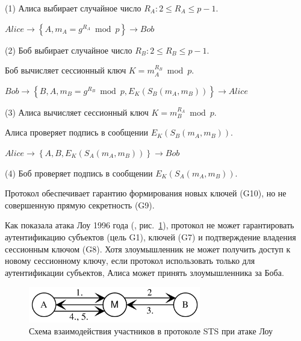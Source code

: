 \begin{protocol}
    \item[(1)] Алиса выбирает случайное число $R_A: 2 \leq R_A \leq p-1$.
    \item[{}] $Alice \to \left\{ A, m_A = g^{R_A} \bmod p \right\} \to Bob$

    \item[(2)] Боб выбирает случайное число $R_B: 2 \leq R_B \leq p-1$.
    \item[{}] Боб вычисляет сессионный ключ $K = m_A^{R_B} \bmod p$.
    \item[{}] $Bob \to \left\{ B, A, m_B = g^{R_B} \bmod p, E_K( S_B ( m_A, m_B )) \right\} \to Alice$

    \item[(3)] Алиса вычисляет сессионный ключ $K = m_B^{R_A} \bmod p$.
    \item[{}] Алиса проверяет подпись в сообщении $E_K( S_B ( m_A, m_B ))$.
    \item[{}] $Alice \to \left\{ A, B, E_K( S_A ( m_A, m_B ) ) \right\} \to Bob$

    \item[(4)] Боб проверяет подпись в сообщении $E_K( S_A ( m_A, m_B ))$.
\end{protocol}

Протокол обеспечивает гарантию формирования новых ключей (G10), но не совершенную прямую секретность (G9).

Как показала атака Лоу 1996 года (\cite{Lowe:1996}, рис.~\ref{fig:key_distribution-sts-attack}), протокол не может гарантировать аутентификацию субъектов (цель G1), ключей (G7) и подтверждение владения сессионным ключом (G8). Хотя злоумышленник не может получить доступ к новому сессионному ключу, если протокол использовать только для аутентификации субъектов, Алиса может принять злоумышленника за Боба.

\begin{figure}
    \centering
    \includegraphics[width=0.67\textwidth]{pic/key_distribution-sts-attack}
    \caption{Схема взаимодействия участников в протоколе STS при атаке Лоу\label{fig:key_distribution-sts-attack}}
\end{figure}

